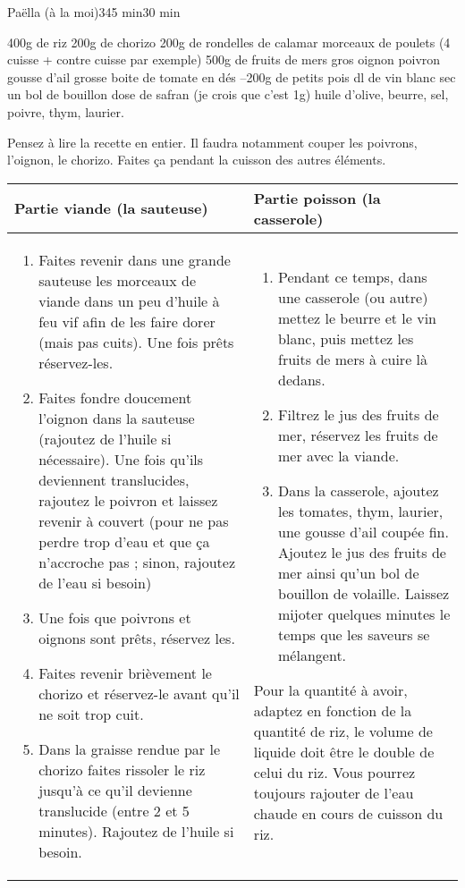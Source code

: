 \begin{recette}{Paëlla (à la moi)}{3}{45 min}{30 min}
\begin{ingredients}
\ingredient 400g de riz
\ingredient 200g de chorizo
\ingredient 200g de rondelles de calamar
 morceaux de poulets (4 cuisse + contre cuisse par exemple)
\ingredient 500g de fruits de mers
 gros oignon
 poivron
 gousse d'ail
 grosse boite de tomate en dés
--200g de petits pois
 dl de vin blanc sec
\ingredient un bol de bouillon
 dose de safran (je crois que c'est 1g)
\ingredient huile d'olive, beurre, sel, poivre, thym, laurier.
\end{ingredients}

\begin{preparation*}
Pensez à lire la recette en entier. Il faudra notamment couper les poivrons, l'oignon, le chorizo. Faites ça pendant la cuisson des autres éléments.

\begin{tabular}{p{}|p{}}
Partie viande (la sauteuse)& Partie poisson (la casserole)\\\hline
\begin{enumerate}
\item Faites revenir dans une grande sauteuse les morceaux de viande dans un peu d'huile à feu vif afin de les faire dorer (mais pas cuits). Une fois prêts réservez-les.
\item Faites fondre doucement l'oignon dans la sauteuse (rajoutez de l'huile si nécessaire). Une fois qu'ils deviennent translucides, rajoutez le poivron et laissez revenir à couvert (pour ne pas perdre trop d'eau et que ça n'accroche pas ; sinon, rajoutez de l'eau si besoin)
\item Une fois que poivrons et oignons sont prêts, réservez les. 
\item Faites revenir brièvement le chorizo et réservez-le avant qu'il ne soit trop cuit. 
\item Dans la graisse rendue par le chorizo faites rissoler le riz jusqu'à ce qu'il devienne translucide (entre 2 et 5 minutes). Rajoutez de l'huile si besoin.
\end{enumerate}&\begin{enumerate}
\item Pendant ce temps, dans une casserole (ou autre) mettez le beurre et le vin blanc, puis mettez les fruits de mers à cuire là dedans\footnotemark.
\item Filtrez le jus des fruits de mer, réservez les fruits de mer avec la viande. 
\item Dans la casserole, ajoutez les tomates, thym, laurier, une gousse d'ail coupée fin. Ajoutez le jus des fruits de mer ainsi qu'un bol de bouillon de volaille. Laissez mijoter quelques minutes le temps que les saveurs se mélangent.
\end{enumerate}
\begin{remarque}
Pour la quantité à avoir, adaptez en fonction de la quantité de riz, le volume de liquide doit être le double de celui du riz. Vous pourrez toujours rajouter de l'eau chaude en cours de cuisson du riz.


\end{remarque}
\end{tabular}
\end{preparation*}
\end{recette}
